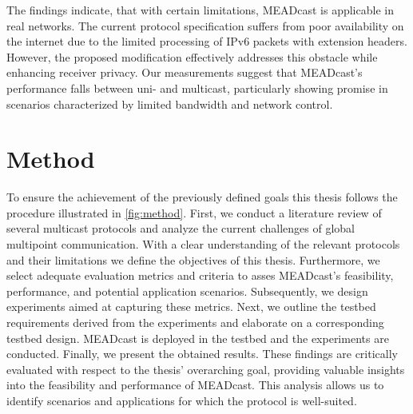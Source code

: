 The findings indicate, that with certain limitations, MEADcast is applicable in
    real networks.
The current protocol specification suffers from poor availability on the
    internet due to the limited processing of IPv6 packets with extension
    headers.
However, the proposed modification effectively addresses this obstacle while
    enhancing receiver privacy.
Our measurements suggest that MEADcast's performance falls between uni- and
    multicast, particularly showing promise in scenarios characterized by
    limited bandwidth and network control.



\section{Method} %
\label{sec:Method}
To ensure the achievement of the previously defined goals this thesis follows
    the procedure illustrated in \autoref{fig:method}.
First, we conduct a literature review of several multicast protocols and
    analyze the current challenges of global multipoint communication.
With a clear understanding of the relevant protocols and their limitations we
    define the objectives of this thesis.
Furthermore, we select adequate evaluation metrics and criteria to asses
    MEADcast's feasibility, performance, and potential application scenarios.
Subsequently, we design experiments aimed at capturing these metrics.
Next, we outline the testbed requirements derived from the experiments and
    elaborate on a corresponding testbed design.
MEADcast is deployed in the testbed and the experiments are conducted.
Finally, we present the obtained results.
These findings are critically evaluated with respect to the thesis' overarching
    goal, providing valuable insights into the feasibility and performance of
    MEADcast.
This analysis allows us to identify scenarios and applications for which the
    protocol is well-suited.


